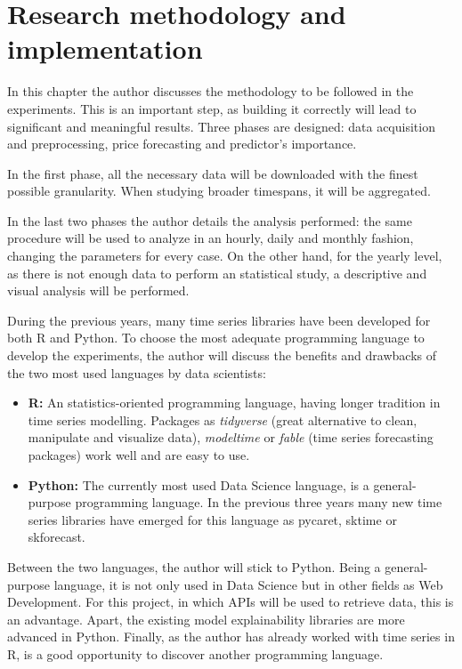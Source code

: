 \chapter{Research methodology and implementation}
\label{ch:methodology}
In this chapter the author discusses the methodology to be followed in the experiments. This is an important step, as building it correctly will lead to significant and meaningful results.
Three phases are designed: data acquisition and preprocessing, price forecasting and predictor's importance.

In the first phase, all the necessary data will be downloaded with the finest possible granularity.
When studying broader timespans, it will be aggregated.

In the last two phases the author details the analysis performed: the same procedure will be used to analyze in an hourly, daily and monthly fashion, changing the parameters for every case.
On the other hand, for the yearly level, as there is not enough data to perform an statistical study, a descriptive and visual analysis will be performed.

During the previous years, many time series libraries have been developed for both R and Python. To choose the most adequate programming language to develop the experiments, the author will discuss the benefits and drawbacks of the two most used languages by data scientists:
\begin{itemize}
    \item \textbf{R:} An statistics-oriented programming language, having longer tradition in time series modelling. Packages as \textit{tidyverse} (great alternative to clean, manipulate and visualize data), \textit{modeltime} or \textit{fable} (time series forecasting packages) work well and are easy to use.
    \item \textbf{Python:} The currently most used Data Science language, is a general-purpose programming language. In the previous three years many new time series libraries have emerged for this language as pycaret, sktime or skforecast.
\end{itemize}

Between the two languages, the author will stick to Python. Being a general-purpose language, it is not only used in Data Science but in other fields as Web Development. For this project, in which APIs will be used to retrieve data, this is an advantage. Apart, the existing model explainability libraries are more advanced in Python. Finally, as the author has already worked with time series in R, is a good opportunity to discover another programming language.


